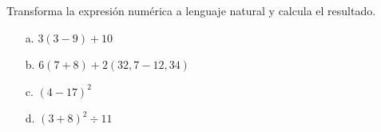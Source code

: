 \documentclass[spanish,letterpaper, 11pt, addpoints, answers]{exam}
\begin{document}
\begin{questions}
  \question Transforma la expresión numérica a lenguaje natural y calcula el resultado.
  \begin{multicols}{2}
    \begin{itemize}
      \item[a.] $3(3-9)+10$
      \item[b.] $6(7+8)+2(32{,}7-12{,}34)$
      \item[c.] $(4-17)^2$
      \item[d.] $(3+8)^2\div 11$
    \end{itemize}

  \end{multicols}

\end{questions}
\end{document}
